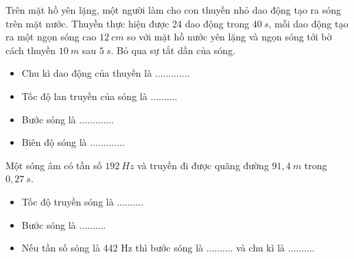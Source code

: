 \begin{vidu}
Trên mặt hồ yên lặng, một người làm cho con thuyền nhỏ dao động tạo ra sóng trên mặt nước. Thuyền thực hiện được 24 dao động trong $40\ s$, mỗi dao động tạo ra một ngọn sóng cao $12\ cm$ so với mặt hồ nước yên lặng và ngọn sóng tới bờ cách thuyền $10\ m$ sau $5\ s$. Bỏ qua sự tắt dần của sóng.
\begin{itemize}
\item[1,] Chu kì dao động của thuyền là .............
\item[2.] Tốc độ lan truyền của sóng là ..........
\item[3.] Bước sóng là .............
\item[4.] Biên độ sóng là .............
\end{itemize}
\end{vidu} 
\begin{vidu}%
Một sóng âm có tần số $192\ Hz$ và truyền đi được quãng đường $91,4\ m$ trong $0,27\ s$.
\begin{itemize}
\item[1.] Tốc độ truyền sóng là ..........
\item[2.] Bước sóng  là ..........
\item[3.] Nếu tần số sóng là 442 Hz thì bước sóng  là .......... và chu kì là ..........
\end{itemize}
\end{vidu} 


